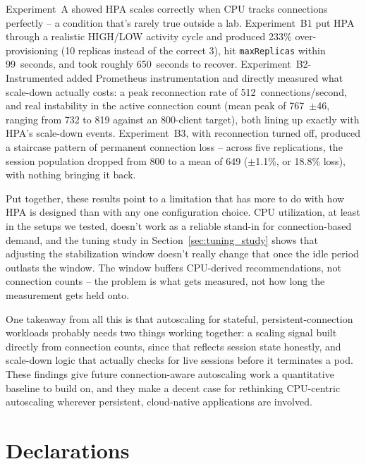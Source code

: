 \documentclass[pdflatex,sn-mathphys-num]{sn-jnl}
\theoremstyle{thmstyleone}%
\theoremstyle{thmstyletwo}%
\theoremstyle{thmstylethree}%
\begin{document}
Experiment~A showed HPA scales correctly when CPU tracks connections perfectly --
a condition that's rarely true outside a lab. Experiment~B1 put HPA through a
realistic HIGH/LOW activity cycle and produced 233\% over-provisioning (10 replicas
instead of the correct 3), hit \texttt{maxReplicas} within 99~seconds, and took
roughly 650~seconds to recover. Experiment~B2-Instrumented added Prometheus
instrumentation and directly measured what scale-down actually costs: a peak
reconnection rate of 512~connections/second, and real instability in the active
connection count (mean peak of 767~$\pm$46, ranging from 732 to 819 against an
800-client target), both lining up exactly with HPA's scale-down events.
Experiment~B3, with reconnection turned off, produced a staircase pattern of
permanent connection loss -- across five replications, the session population
dropped from 800 to a mean of 649 ($\pm$1.1\%, or 18.8\% loss), with nothing
bringing it back.

Put together, these results point to a limitation that has more to do with how HPA
is designed than with any one configuration choice. CPU utilization, at least in
the setups we tested, doesn't work as a reliable stand-in for connection-based
demand, and the tuning study in Section~\ref{sec:tuning_study} shows that adjusting
the stabilization window doesn't really change that once the idle period outlasts
the window. The window buffers CPU-derived recommendations, not connection counts
-- the problem is what gets measured, not how long the measurement gets held onto.

One takeaway from all this is that autoscaling for stateful, persistent-connection
workloads probably needs two things working together: a scaling signal built
directly from connection counts, since that reflects session state honestly, and
scale-down logic that actually checks for live sessions before it terminates a pod.
These findings give future connection-aware autoscaling work a quantitative
baseline to build on, and they make a decent case for rethinking CPU-centric
autoscaling wherever persistent, cloud-native applications are involved.



\backmatter

\section*{Declarations}
\end{document}
